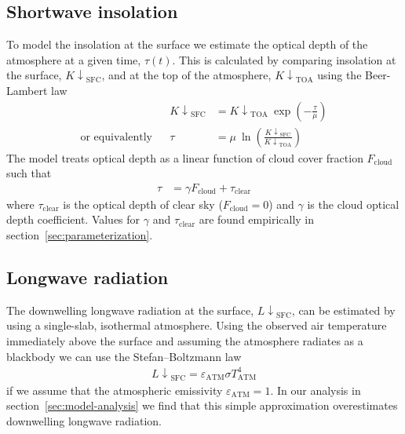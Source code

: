 \documentclass[a4paper,titlepage, twoside]{report}
\newcommand\Kdownsfc{{K\!\!\downarrow}_\mathrm{SFC}}
\newcommand\Kdowntoa{{K\!\!\downarrow}_\mathrm{TOA}}
\newcommand\Ldownsfc{{L\!\!\downarrow}_\mathrm{SFC}}
\begin{document}
\subsection{Shortwave insolation}
To model the insolation at the surface we estimate the optical depth of the atmosphere at a given time, $\tau(t)$.  This is calculated by comparing insolation at the surface, $\Kdownsfc$, and at the top of the atmosphere, $\Kdowntoa$ using the Beer-Lambert law \parencite{stephens}
\begin{align}
&& \Kdownsfc &= \Kdowntoa\: \exp \left( -\frac{\tau}{\mu} \right) \\
\text{or equivalently} && \tau &= \mu \: \ln \left( \frac{\Kdownsfc}{\Kdowntoa} \right)
\end{align}
The model treats optical depth as a linear function of cloud cover fraction $F_\mathrm{cloud}$ such that 
\begin{align}
\tau &= \gamma F_\mathrm{cloud} + \tau_\mathrm{clear} \label{eq:linear-sw-cloud}
\end{align}
where $\tau_\mathrm{clear}$ is the optical depth of clear sky ($F_\mathrm{cloud} = 0$) and $\gamma$ is the cloud optical depth coefficient.   Values for $\gamma$ and $\tau_\mathrm{clear}$ are found empirically in section~\ref{sec:parameterization}.

\subsection{Longwave radiation}
\label{sec:longwave-model}
The downwelling longwave radiation at the surface, $\Ldownsfc$, can be estimated by using a single-slab, isothermal atmosphere.  Using the observed air temperature immediately above the surface and assuming the atmosphere radiates as a blackbody we can use the Stefan--Boltzmann law \parencite[p. 168]{ambaum}
\begin{align}
\Ldownsfc = \varepsilon_\mathrm{ATM} \sigma T_\mathrm{ATM}^4 \label{eq:stefan-boltzmann}
\end{align}
if we assume that the atmospheric emissivity $\varepsilon_\mathrm{ATM} = 1$.  In our analysis in section~\ref{sec:model-analysis} we find that this simple approximation overestimates downwelling longwave radiation.
\end{document}
